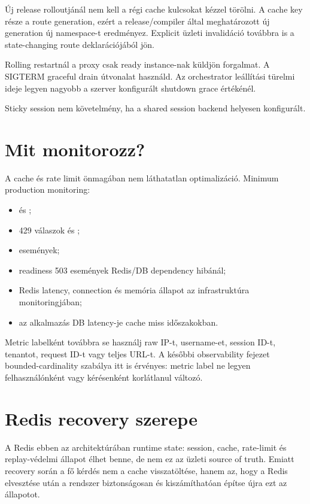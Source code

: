 Új release rolloutjánál nem kell a régi cache kulcsokat kézzel törölni. A cache key része a route generation, ezért a release/compiler által meghatározott új generation új namespace-t eredményez. Explicit üzleti invalidáció továbbra is a state-changing route deklarációjából jön.

Rolling restartnál a proxy csak ready instance-nak küldjön forgalmat. A SIGTERM graceful drain útvonalat használd. Az orchestrator leállítási türelmi ideje legyen nagyobb a szerver konfigurált shutdown grace értékénél.

Sticky session nem követelmény, ha a shared session backend helyesen konfigurált.

\section{Mit monitorozz?}

A cache és rate limit önmagában nem láthatatlan optimalizáció. Minimum production monitoring:

\begin{itemize}
  \item {} és ;
  \item 429 válaszok és ;
  \item {} események;
  \item readiness 503 események Redis/DB dependency hibánál;
  \item Redis latency, connection és memória állapot az infrastruktúra monitoringjában;
  \item az alkalmazás DB latency-je cache miss időszakokban.
\end{itemize}

Metric labelként továbbra se használj raw IP-t, username-et, session ID-t, tenantot, request ID-t vagy teljes URL-t. A későbbi observability fejezet bounded-cardinality szabálya itt is érvényes: metric label ne legyen felhasználónként vagy kérésenként korlátlanul változó.

\section{Redis recovery szerepe}

A Redis ebben az architektúrában runtime state: session, cache, rate-limit és replay-védelmi állapot élhet benne, de nem ez az üzleti source of truth. Emiatt recovery során a fő kérdés nem a cache visszatöltése, hanem az, hogy a Redis elvesztése után a rendszer biztonságosan és kiszámíthatóan építse újra ezt az állapotot.

